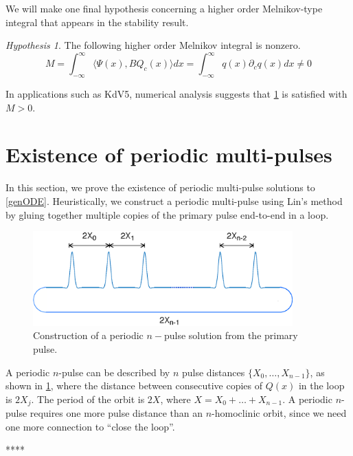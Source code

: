 \documentclass[11pt,reqno]{amsart}
\theoremstyle{plain}
\theoremstyle{definition}
\theoremstyle{remark}
\newtheorem{hypothesis}[theorem]{Hypothesis}
\begin{document}
We will make one final hypothesis concerning a higher order Melnikov-type integral that appears in the stability result.

\begin{hypothesis}\label{Melnikov2hyp}
The following higher order Melnikov integral is nonzero.
\begin{equation}\label{M2}
M = \int_{-\infty}^\infty \langle \Psi(x), B Q_c(x) \rangle dx =
\int_{-\infty}^\infty q(x) \partial_c q(x) dx \neq 0
\end{equation}
\end{hypothesis}

In applications such as KdV5, numerical analysis suggests that \cref{Melnikov2hyp} is satisfied with $M > 0$.

\section{Existence of periodic multi-pulses}\label{sec:perexist}

In this section, we prove the existence of periodic multi-pulse solutions to \cref{genODE}. Heuristically, we construct a periodic multi-pulse using Lin's method by gluing together multiple copies of the primary pulse end-to-end in a loop.
\begin{figure}
\begin{center}
\includegraphics[width=10cm]{images/multipulseperiodic}
\end{center}
\caption[Construction of a periodic $n-$pulse solution]{Construction of a periodic $n-$pulse solution from the primary pulse.}
\label{fig:permultipulse}
\end{figure}
A periodic $n$-pulse can be described by $n$ pulse distances $\{X_0, \dots, X_{n-1} \}$, as shown in \cref{fig:permultipulse}, where the distance between consecutive copies of $Q(x)$ in the loop is $2 X_j$. The period of the orbit is $2X$, where $X = X_0 + \dots + X_{n-1}$. A periodic $n$-pulse requires one more pulse distance than an $n$-homoclinic orbit, since we need one more connection to ``close the loop''.  

****
\end{document}
